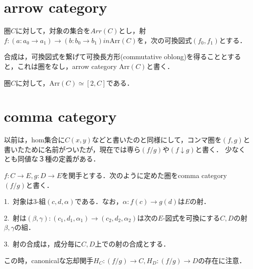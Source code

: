 \documentclass[uplatex, 12pt, dvipdfmx]{jsreport}
\begin{document}
\section{arrow category}

\begin{definition}\rm{}
    圏$C$に対して，対象の集合を$Arr(C)$とし，射$f:(a:a_0\to a_1)\to (b:b_0\to b_1) in \mathrm{Arr}(C)$を，次の可換図式$(f_0,f_1)$とする．
    \begin{center}\end{center}
    合成は，可換図式を繋げて可換長方形(commutative oblong)を得ることとすると，これは圏をなし，arrow category $\mathrm{Arr}(C)$と書く．
\end{definition}

\begin{proposition}
    圏$C$に対して，$\mathrm{Arr}(C)\simeq [2,C]$である．
\end{proposition}

\section{comma category}

以前は，hom集合に$C(x,y)$などと書いたのと同様にして，コンマ圏を$(f,g)$と書いたために名前がついたが，現在では専ら$(f/g)$や$(f\downarrow g)$と書く．
少なくとも同値な３種の定義がある．

\begin{definition}\rm{}
    $f:C\to E, g:D\to E$を関手とする．次のように定めた圏をcomma category $(f/g)$と書く．

    1.\, 対象は3-組$(c,d,\alpha )$である．なお，$\alpha :f(c)\to g(d)$は$E$の射．

    2.\, 射は$(\beta ,\gamma ):(c_1, d_1, \alpha_1)\to (c_2, d_2, \alpha_2)$は次の$E$-図式を可換にする$C,D$の射$\beta,\gamma$の組．
    \begin{center}\end{center}

    3.\, 射の合成は，成分毎に$C,D$上での射の合成とする．

    この時，canonicalな忘却関手$H_C:(f/g)\to C, H_D:(f/g)\to D$の存在に注意．
\end{definition}
\end{document}
